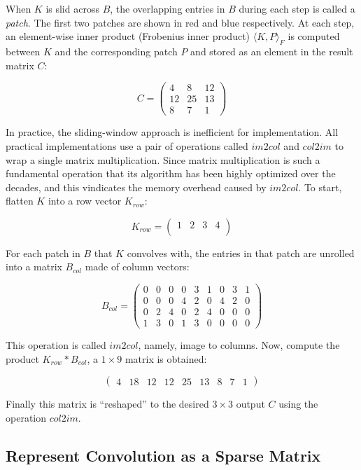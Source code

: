 When $K$ is slid across $B$, the overlapping entries in $B$ during each step is called a \textit{patch}.
The first two patches are shown in red and blue respectively. At each step, an element-wise inner product
(Frobenius inner product) $\langle K,P \rangle_{F}$ is computed between $K$ and the corresponding patch $P$
and stored as an element in the result matrix $C$:

$$
C =
  \begin{pmatrix}
    4 & 8 & 12 \\
    12 & 25 & 13 \\
    8 & 7 & 1
  \end{pmatrix}
$$

In practice, the sliding-window approach is inefficient for implementation. All practical implementations
use a pair of operations called $im2col$ and $col2im$ to wrap a single matrix multiplication. Since
matrix multiplication is such a fundamental operation that its algorithm has been highly optimized over the
decades, and this vindicates the memory overhead caused by $im2col$. To start, flatten $K$ into a row vector
$K_{row}$:

$$
K_{row} =
  \begin{pmatrix}
    1 & 2 & 3 & 4 \\
  \end{pmatrix}
$$

For each patch in $B$ that $K$ convolves with, the entries in that patch are unrolled into a matrix $B_{col}$
made of column vectors:

$$
B_{col} =
  \begin{pmatrix}
    0 & 0 & 0 & 0 & 3 & 1 & 0 & 3 & 1 \\
    0 & 0 & 0 & 4 & 2 & 0 & 4 & 2 & 0 \\
    0 & 2 & 4 & 0 & 2 & 4 & 0 & 0 & 0 \\
    1 & 3 & 0 & 1 & 3 & 0 & 0 & 0 & 0
  \end{pmatrix}
$$

This operation is called $im2col$, namely, image to columns. Now, compute the product $K_{row} * B_{col}$,
a $1 \times 9$ matrix is obtained:

$$
\begin{pmatrix}
  4 & 18 & 12 & 12 & 25 & 13 & 8 & 7 & 1
\end{pmatrix}
$$

Finally this matrix is ``reshaped'' to the desired $3 \times 3$ output $C$ using the operation $col2im$.

\subsection{Represent Convolution as a Sparse Matrix}

